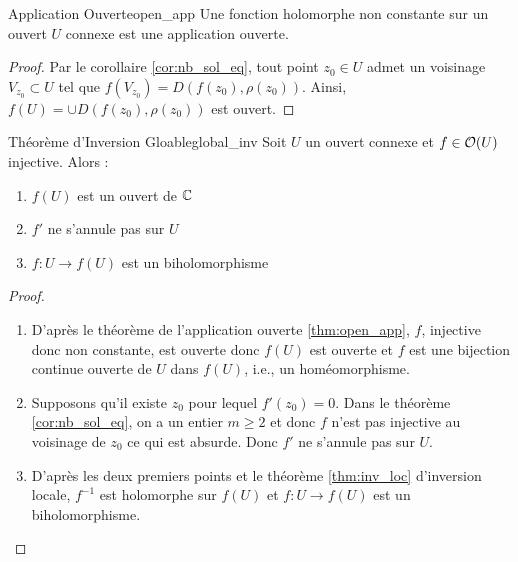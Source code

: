 \documentclass{cours}
\begin{document}
\begin{théorème}{Application Ouverte}{open_app}
    Une fonction holomorphe non constante sur un ouvert $U$ connexe est une application ouverte.
\end{théorème}
\begin{proof}
    Par le corollaire \ref{cor:nb_sol_eq}, tout point $z_{0} \in U$ admet un voisinage $V_{z_{0}} \subset U$ tel que $f(V_{z_{0}}) = D(f(z_{0}), \rho(z_{0}))$. Ainsi, $f(U) = \cup D(f(z_{0}), \rho(z_{0}))$ est ouvert. 
\end{proof}
\begin{théorème}{Théorème d'Inversion Gloable}{global_inv}
    Soit $U$ un ouvert connexe et $f \in \mathcal{O}(U)$ injective. Alors : 
    \begin{enumerate}
        \item $f(U)$ est un ouvert de $\mathbb{C}$
        \item $f'$ ne s'annule pas sur $U$
        \item $f : U \to f(U)$ est un biholomorphisme
    \end{enumerate}
\end{théorème}
\begin{proof}
    \begin{enumerate}
        \item D'après le théorème de l'application ouverte \ref{thm:open_app}, $f$, injective donc non constante, est ouverte donc $f(U)$ est ouverte et $f$ est une bijection continue ouverte de $U$ dans $f(U)$, i.e., un homéomorphisme. 
        \item Supposons qu'il existe $z_{0}$ pour lequel $f'(z_{0}) = 0$. Dans le théorème \ref{cor:nb_sol_eq}, on a un entier $m \geq 2$ et donc $f$ n'est pas injective au voisinage de $z_{0}$ ce qui est absurde. Donc $f'$ ne s'annule pas sur $U$. 
        \item D'après les deux premiers points et le théorème \ref{thm:inv_loc} d'inversion locale, $f^{-1}$ est holomorphe sur $f(U)$ et $f: U \to f(U)$ est un biholomorphisme.
    \end{enumerate}
\end{proof}
\end{document}
